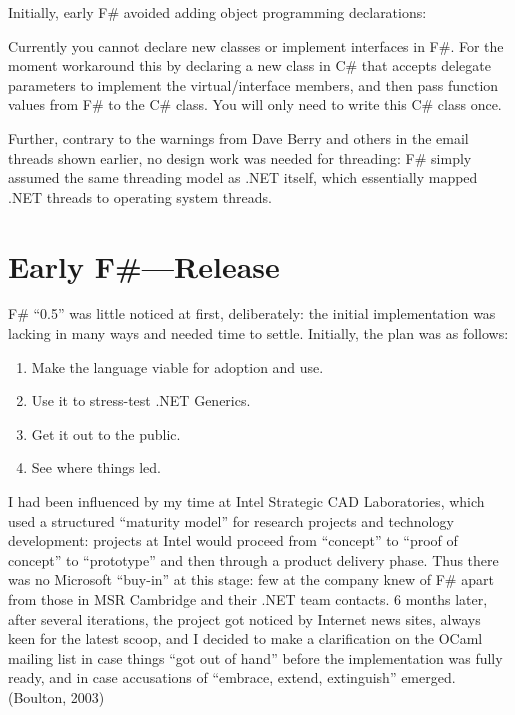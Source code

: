 \documentclass[acmsmall]{acmart}\settopmatter{}
\begin{document}
Initially, early F\# avoided adding object programming declarations:
\begin{verbquote}
Currently you cannot declare new classes or implement interfaces in F#.  For the moment workaround this by declaring a new class in C# that accepts delegate parameters to implement the virtual/interface members, and then pass function values from F# to the C# class.  You will only need to write this C# class once.
\end{verbquote}

Further, contrary to the warnings from Dave Berry and others in the email threads shown earlier, no design work was needed for threading: F\# simply assumed the same threading model as .NET itself, which essentially mapped .NET threads to operating system threads.



\section*{Early F\#---Release}


F\# “0.5” was little noticed at first, deliberately: the initial implementation was lacking in many ways and needed time to settle. Initially, the plan was as follows: 
\begin{enumerate}
\item Make the language viable for adoption and use.
\item Use it to stress-test .NET Generics.
\item Get it out to the public.
\item See where things led.
\end{enumerate}

I had been influenced by my time at Intel Strategic CAD Laboratories, which used a structured “maturity model” for research projects and technology development: projects at Intel would proceed from “concept” to “proof of concept” to “prototype” and then through a product delivery phase. Thus there was no Microsoft “buy-in” at this stage: few at the company knew of F\# apart from those in MSR Cambridge and their .NET team contacts. 6 months later, after several iterations, the project got noticed by Internet news sites, always keen for the latest scoop, and I decided to make a clarification on the OCaml mailing list in case things “got out of hand” before the implementation was fully ready, and in case accusations of “embrace, extend, extinguish” emerged. (Boulton, 2003)
\end{document}

